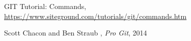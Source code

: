 \begin{thebibliography}{99999}
\singlespace\normalsize

 GIT Tutorial: Commands, \url{https://www.siteground.com/tutorials/git/commands.htm}


 Scott Chacon and Ben Straub , \textit{Pro Git}, 2014



\end{thebibliography}
